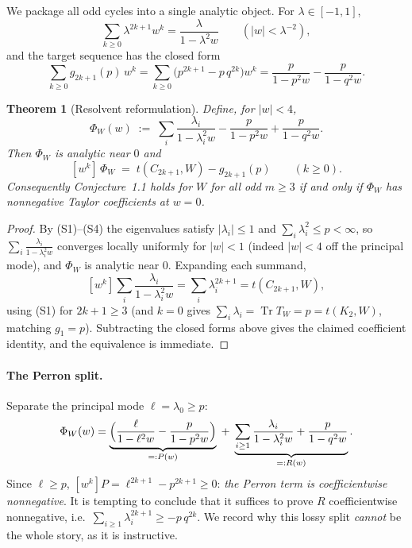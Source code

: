 \documentclass[11pt]{article}
\newtheorem{theorem}{Theorem}[section]
\theoremstyle{definition}
\newcommand{\Tr}{\operatorname{Tr}}
\newcommand{\1}{\mathbf{1}}
\begin{document}
We package all odd cycles into a single analytic object. For $\lambda\in[-1,1]$,
\[
\sum_{k\ge0}\lambda^{2k+1}w^k=\frac{\lambda}{1-\lambda^2w}\qquad(|w|<\lambda^{-2}),
\]
and the target sequence has the closed form
\[
\sum_{k\ge0}g_{2k+1}(p)\,w^k
=\sum_{k\ge0}\bigl(p^{2k+1}-p\,q^{2k}\bigr)w^k
=\frac{p}{1-p^2w}-\frac{p}{1-q^2w}.
\]

\begin{theorem}[Resolvent reformulation]\label{thm:reform}
Define, for $|w|<4$,
\[
\Phi_W(w)\;:=\;\sum_i\frac{\lambda_i}{1-\lambda_i^2w}
-\frac{p}{1-p^2w}+\frac{p}{1-q^2w}.
\]
Then $\Phi_W$ is analytic near $0$ and
\[
[w^k]\,\Phi_W \;=\; t(C_{2k+1},W)-g_{2k+1}(p)\qquad(k\ge0).
\]
Consequently Conjecture~1.1 holds for $W$ for all odd $m\ge3$ if and only if
$\Phi_W$ has nonnegative Taylor coefficients at $w=0$.
\end{theorem}

\begin{proof}
By (S1)--(S4) the eigenvalues satisfy $|\lambda_i|\le 1$ and
$\sum_i\lambda_i^2\le p<\infty$, so $\sum_i\frac{\lambda_i}{1-\lambda_i^2w}$
converges locally uniformly for $|w|<1$ (indeed $|w|<4$ off the principal mode),
and $\Phi_W$ is analytic near $0$. Expanding each summand,
\[
[w^k]\sum_i\frac{\lambda_i}{1-\lambda_i^2w}=\sum_i\lambda_i^{2k+1}=t(C_{2k+1},W),
\]
using (S1) for $2k+1\ge3$ (and $k=0$ gives $\sum_i\lambda_i=\Tr T_W=p=t(K_2,W)$,
matching $g_1=p$). Subtracting the closed forms above gives the claimed
coefficient identity, and the equivalence is immediate.
\end{proof}

\paragraph{The Perron split.}
Separate the principal mode $\ell=\lambda_0\ge p$:
\begin{equation}\label{eq:split}
\Phi_W(w)=\underbrace{\Bigl(\frac{\ell}{1-\ell^2w}-\frac{p}{1-p^2w}\Bigr)}_{=:P(w)}
\;+\;\underbrace{\sum_{i\ge1}\frac{\lambda_i}{1-\lambda_i^2w}+\frac{p}{1-q^2w}}_{=:R(w)} .
\end{equation}
Since $\ell\ge p$, $[w^k]P=\ell^{2k+1}-p^{2k+1}\ge0$: \emph{the Perron term is
coefficientwise nonnegative}. It is tempting to conclude that it suffices to
prove $R$ coefficientwise nonnegative, i.e.\
$\sum_{i\ge1}\lambda_i^{2k+1}\ge -p\,q^{2k}$. We record why this lossy split
\emph{cannot} be the whole story, as it is instructive.
\end{document}
